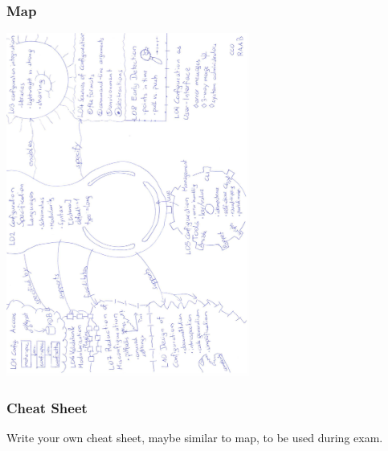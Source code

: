 \begin{frame}
	\frametitle{Map}

	\includegraphics[width=8cm,angle=-90]{pics/map.pdf}
\end{frame}

\begin{frame}
	\frametitle{Cheat Sheet}

	Write your own cheat sheet, maybe similar to map, to be used during exam.
\end{frame}




\nocite{raab2017introducing}

\appendix

\begin{frame}[allowframebreaks]
	
	
\end{frame}



